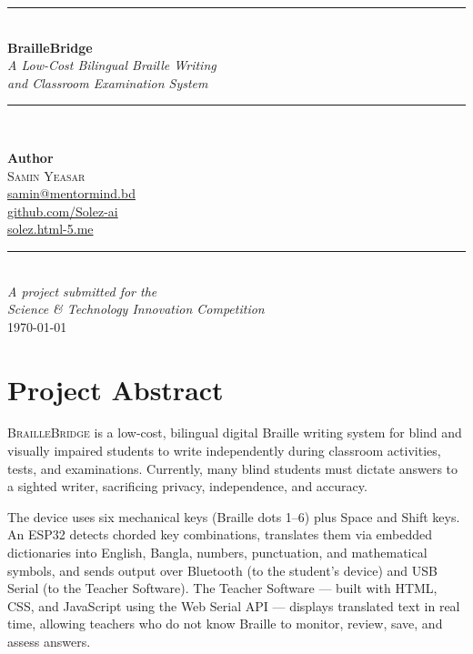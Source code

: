 \documentclass[11pt,a4paper,twoside]{article}
\newcommand{\projectname}{\textsc{BrailleBridge}}
\begin{document}
\begin{titlepage}\centering\vspace*{1.8cm}
{\color{richgold}\rule{0.75\textwidth}{1.2pt}}\\[1.2em]\vspace{0.6cm}
{\Huge\bfseries\sffamily BrailleBridge}\\[0.3cm]
{\Large\itshape A Low-Cost Bilingual Braille Writing}\\
{\Large\itshape and Classroom Examination System}\\[1.2cm]
{\color{richgold}\rule{0.75\textwidth}{1.2pt}}\\[2cm]\vfill
\begin{minipage}{0.7\textwidth}\centering\large
\textbf{Author}\\[0.3em]{\Large\scshape Samin Yeasar}\\[0.8em]
\href{mailto:samin@mentormind.bd}{samin@mentormind.bd}\\[0.3em]
\href{https://github.com/Solez-ai}{github.com/Solez-ai}\\[0.3em]
\href{https://solez.html-5.me}{solez.html-5.me}\\[1.2em]
{\color{richgold}\rule{0.4\textwidth}{0.6pt}}\\[1em]
\small\textit{A project submitted for the}\\[0.2em]
\textit{Science \& Technology Innovation Competition}\\[0.2em]\vspace{1.2cm}\today
\end{minipage}\vfill\end{titlepage}

\clearpage\tableofcontents\clearpage

\section{Project Abstract}

\projectname{} is a low-cost, bilingual digital Braille writing system for
blind and visually impaired students to write independently during
classroom activities, tests, and examinations. Currently, many blind
students must dictate answers to a sighted writer, sacrificing privacy,
independence, and accuracy.

The device uses six mechanical keys (Braille dots 1--6) plus Space and
Shift keys. An ESP32 detects chorded key combinations, translates them
via embedded dictionaries into English, Bangla, numbers, punctuation, and
mathematical symbols, and sends output over Bluetooth (to the student's
device) and USB Serial (to the Teacher Software). The Teacher Software ---
built with HTML, CSS, and JavaScript using the Web Serial API --- displays
translated text in real time, allowing teachers who do not know Braille to
monitor, review, save, and assess answers.
\end{document}
